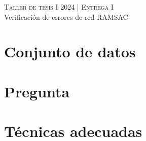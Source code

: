\documentclass[11pt,spanish,a4paper]{article}
\begin{document}
\begin{center}
  \textsc{\large Taller de tesis I 2024 | Entrega I}\\
	Verificación de errores de red RAMSAC
\end{center}

\section*{Conjunto de datos}

\section*{Pregunta}



\section*{Técnicas adecuadas}
\end{document}
